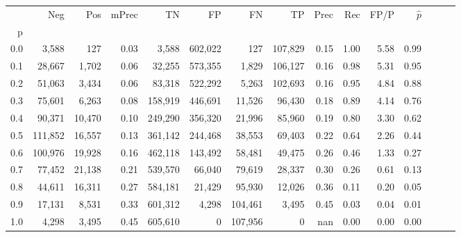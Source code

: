 \begin{tabular}{rrrrrrrrrrrrrrr}
\toprule
{} &      Neg &     Pos & mPrec &       TN &       FP &       FN &       TP &  Prec &   Rec &  FP/P & $\hat{p}$ \\
p   &          &         &       &          &          &          &          &       &       &       &           \\
\midrule
0.0 &    3,588 &     127 &  0.03 &    3,588 &  602,022 &      127 &  107,829 &  0.15 &  1.00 &  5.58 &      0.99 \\
0.1 &   28,667 &   1,702 &  0.06 &   32,255 &  573,355 &    1,829 &  106,127 &  0.16 &  0.98 &  5.31 &      0.95 \\
0.2 &   51,063 &   3,434 &  0.06 &   83,318 &  522,292 &    5,263 &  102,693 &  0.16 &  0.95 &  4.84 &      0.88 \\
0.3 &   75,601 &   6,263 &  0.08 &  158,919 &  446,691 &   11,526 &   96,430 &  0.18 &  0.89 &  4.14 &      0.76 \\
0.4 &   90,371 &  10,470 &  0.10 &  249,290 &  356,320 &   21,996 &   85,960 &  0.19 &  0.80 &  3.30 &      0.62 \\
0.5 &  111,852 &  16,557 &  0.13 &  361,142 &  244,468 &   38,553 &   69,403 &  0.22 &  0.64 &  2.26 &      0.44 \\
0.6 &  100,976 &  19,928 &  0.16 &  462,118 &  143,492 &   58,481 &   49,475 &  0.26 &  0.46 &  1.33 &      0.27 \\
0.7 &   77,452 &  21,138 &  0.21 &  539,570 &   66,040 &   79,619 &   28,337 &  0.30 &  0.26 &  0.61 &      0.13 \\
0.8 &   44,611 &  16,311 &  0.27 &  584,181 &   21,429 &   95,930 &   12,026 &  0.36 &  0.11 &  0.20 &      0.05 \\
0.9 &   17,131 &   8,531 &  0.33 &  601,312 &    4,298 &  104,461 &    3,495 &  0.45 &  0.03 &  0.04 &      0.01 \\
1.0 &    4,298 &   3,495 &  0.45 &  605,610 &        0 &  107,956 &        0 &   nan &  0.00 &  0.00 &      0.00 \\
\bottomrule
\end{tabular}
